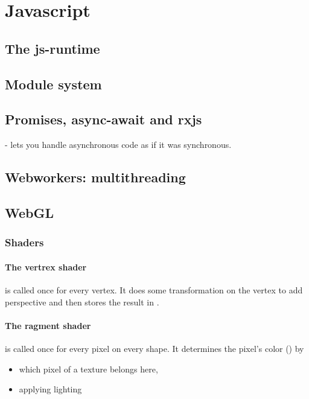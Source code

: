 \section{Javascript}

\subsection{The js-runtime}

\subsection{Module system}

\subsection{Promises, async-await and rxjs}
 -  lets you handle asynchronous code as if it was synchronous. 

\subsection{Webworkers: multithreading}


\subsection{WebGL}

\subsubsection{Shaders}
\paragraph{The vertrex shader} is called once for every vertex. It does some transformation on the vertex to add perspective and then stores the result in . 
\paragraph{The ragment shader} is called once for every pixel on every shape. It determines the pixel's color () by
\begin{itemize}
    \item which pixel of a texture belongs here, 
    \item applying lighting
\end{itemize} 

